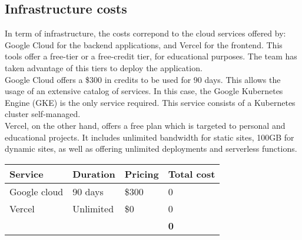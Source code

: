 \documentclass[../memory.tex]{subfiles}
\begin{document}
\subsection{Infrastructure costs}
In term of infrastructure, the costs correpond to the cloud services offered by:
Google Cloud for the backend applications, and Vercel for the frontend. This
tools offer a free-tier or a free-credit tier, for educational purposes. The
team has taken advantage of this tiers to deploy the application.
\\[8pt]
Google Cloud offers a \$300 in credits to be used for 90 days. This allows the
usage of an extensive catalog of services. In this case, the Google Kubernetes
Engine (GKE) is the only service required. This service consists of a Kubernetes
cluster self-managed.
\\[8pt]
Vercel, on the other hand, offers a free plan which is targeted to personal and
educational projects. It includes unlimited bandwidth for static sites, 100GB
for dynamic sites, as well as offering unlimited deployments and serverless
functions.
\\[12pt]
\begin{tabularx}{\textwidth}{|X|X|X|X|}
	\hline
	\rowcolor{rowColor}
	Service               & Duration            & Pricing & Total cost \\
	\hline
	Google cloud          & 90 days             & \$300   & 0\texteuro \\
	\hline
	Vercel                & Unlimited           & \$0     & 0\texteuro \\
	\hline
	\multicolumn{3}{X|}{} & \textbf{0\texteuro}                        \\
	\cline{4-3}
\end{tabularx}
\end{document}
